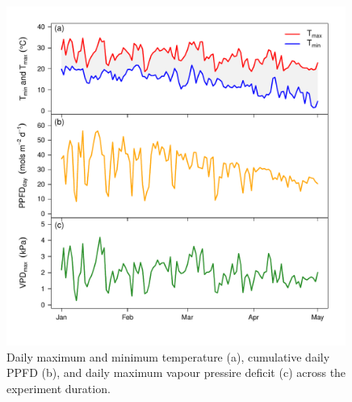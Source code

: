 \documentclass[a4paper]{article}\usepackage[]{graphicx}\usepackage[]{color}
\begin{document}
\begin{figure}[h!]
    \centering
    \includegraphics[width=0.99\textwidth]{airvars.pdf}
    \caption{Daily maximum and minimum temperature (a), cumulative daily PPFD (b), and daily maximum vapour pressire deficit (c) across the experiment duration.}
    \label{fig:figure1}
\end{figure}
\end{document}
